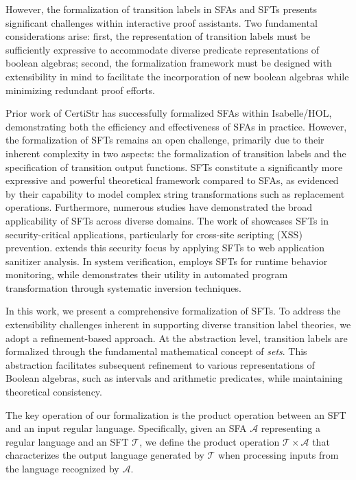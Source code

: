 However, the formalization of transition labels in SFAs and SFTs presents significant challenges within interactive proof assistants. Two fundamental considerations arise: first, the representation of transition labels must be sufficiently expressive to accommodate diverse predicate representations of boolean algebras; second, the formalization framework must be designed with extensibility in mind to facilitate the incorporation of new boolean algebras while minimizing redundant proof efforts.




Prior work of CertiStr \cite{cpp/KanLRS22} has successfully formalized SFAs within Isabelle/HOL, demonstrating both the efficiency and effectiveness of SFAs in practice. However, the formalization of SFTs remains an open challenge, primarily due to their inherent complexity in two aspects: the formalization of transition labels and the specification of transition output functions. SFTs constitute a significantly more expressive and powerful theoretical framework compared to  SFAs, as evidenced by their capability to model complex string transformations such as replacement operations.
%
Furthermore, numerous studies have demonstrated the broad applicability of SFTs across diverse domains. The work of \cite{VeanesHLMB12Transducer} showcases SFTs in security-critical applications, particularly for cross-site scripting (XSS) prevention. \cite{uss/HooimeijerLMSV11} extends this security focus by applying SFTs to web application sanitizer analysis. In system verification, \cite{osdi/YaseenABCL20} employs SFTs for runtime behavior monitoring, while \cite{pldi/HuD17} demonstrates their utility in automated program transformation through systematic inversion techniques.



 
In this work, we present a comprehensive formalization of SFTs. To address the extensibility challenges inherent in supporting diverse transition label theories, we adopt a refinement-based approach. At the abstraction level, transition labels are formalized through the fundamental mathematical concept of \emph{sets}. This abstraction facilitates subsequent refinement to various representations of Boolean algebras, such as intervals and arithmetic predicates, while maintaining theoretical consistency.

The key operation of our formalization is the product operation between an SFT and an input regular language. Specifically, given an SFA $\mathcal{A}$ representing a regular language and an SFT $\mathcal{T}$, we define the product operation $\mathcal{T} \times\mathcal{A}$ that characterizes the output language generated by $\mathcal{T}$ when processing inputs from the language recognized by $\mathcal{A}$.



